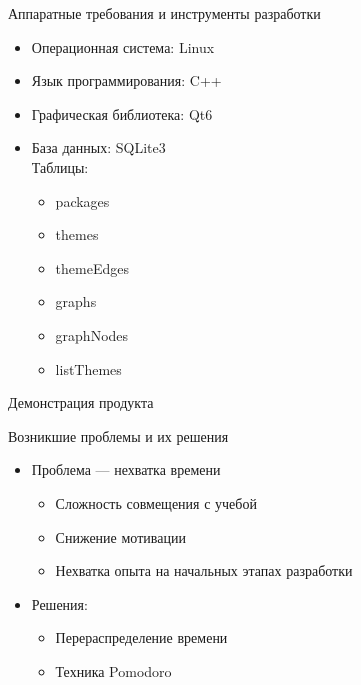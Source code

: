 \begin{frame}{Аппаратные требования и инструменты разработки}
    \begin{itemize}
        \item<+-> Операционная система: Linux
        \item<+-> Язык программирования: C++
        \item<+-> Графическая библиотека: Qt6
        \item<+-> База данных: SQLite3 \\
            Таблицы:
            \begin{itemize}
                \item packages
                \item themes
                \item themeEdges
                \item graphs
                \item graphNodes
                \item listThemes
            \end{itemize}
    \end{itemize}
\end{frame}

\begin{frame}{Демонстрация продукта}
\end{frame}

\begin{frame}{Возникшие проблемы и их решения}
    \begin{itemize}[<+->]
        \item Проблема --- нехватка времени
            \begin{itemize}
                \item Сложность совмещения с учебой
                \item Снижение мотивации
                \item Нехватка опыта на начальных этапах разработки
            \end{itemize}

        \item Решения:
            \begin{itemize}
                \item Перераспределение времени
                \item Техника Pomodoro
            \end{itemize}
    \end{itemize}
\end{frame}

